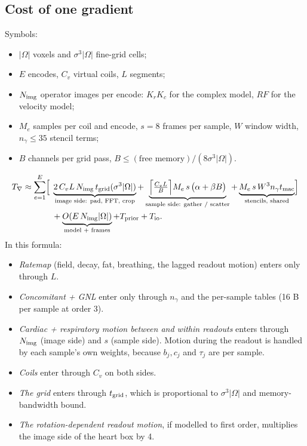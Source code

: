 \documentclass[11pt]{article}
\theoremstyle{remark}
\begin{document}
\subsection{Cost of one gradient}
\label{sec:chaincost}

Symbols:
\begin{itemize}
  \item $|\Omega|$ voxels and $\sigma^3|\Omega|$ fine-grid cells;
  \item $E$ encodes, $C_v$ virtual coils, $L$ segments;
  \item $N_{\rm img}$ operator images per encode: $K_rK_c$ for the complex model, $RF$ for the velocity model;
  \item $M_e$ samples per coil and encode, $s=8$ frames per sample, $W$ window width, $n_\gamma\le35$ stencil terms;
  \item $B$ channels per grid pass, $B\le(\text{free memory})/(8\sigma^3|\Omega|)$.
\end{itemize}
\begin{equation}
\begin{aligned}
T_\nabla\approx\sum_{e=1}^{E}\Bigl[\;&\underbrace{2\,C_vL\,N_{\rm img}\,t_{\rm grid}(\sigma^3|\Omega|)}_{\text{image side: pad, FFT, crop}}
+\underbrace{\Bigl\lceil\tfrac{C_vL}{B}\Bigr\rceil M_e\,s\,\bigl(\alpha+\beta B\bigr)}_{\text{sample side: gather / scatter}}
+\underbrace{M_e\,s\,W^3n_\gamma t_{\rm mac}}_{\text{stencils, shared}}\Bigr]\\
&+\underbrace{O(E\,N_{\rm img}|\Omega|)}_{\text{model + frames}}+T_{\rm prior}+T_{\rm io}.
\end{aligned}
\label{eq:chaincost}
\end{equation}
In this formula:
\begin{itemize}
  \item \emph{Ratemap} (field, decay, fat, breathing, the lagged readout motion) enters only through $L$.
  \item \emph{Concomitant + GNL} enter only through $n_\gamma$ and the per-sample tables (16 B per sample at order 3).
  \item \emph{Cardiac + respiratory motion between and within readouts} enters through $N_{\rm img}$ (image side) and $s$ (sample side). Motion during the readout is handled by each sample's own weights, because $b_j,c_j$ and $\tau_j$ are per sample.
  \item \emph{Coils} enter through $C_v$ on both sides.
  \item \emph{The grid} enters through $t_{\rm grid}$, which is proportional to $\sigma^3|\Omega|$ and memory-bandwidth bound.
  \item \emph{The rotation-dependent readout motion}, if modelled to first order, multiplies the image side of the heart box by 4.
\end{itemize}
\end{document}
